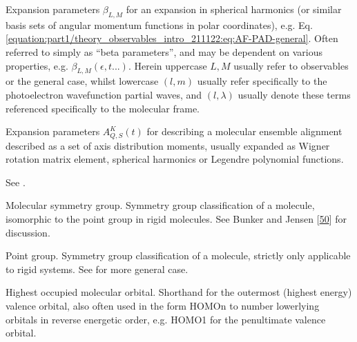 \documentclass[letterpaper,table,10pt,english]{jupyterBook}
\begin{document}
\begin{description}
\sphinxAtStartPar
Expansion parameters \(\beta_{L,M}\) for an expansion in spherical harmonics (or similar basis sets of angular momentum functions in polar coordinates), e.g. Eq. \eqref{equation:part1/theory_observables_intro_211122:eq:AF-PAD-general}. Often referred to simply as “beta parameters”, and may be dependent on various properties, e.g. \(\beta_{L,M}(\epsilon,t...)\). Herein upper\sphinxhyphen{}case \(L,M\) usually refer to observables or the general case, whilst lower\sphinxhyphen{}case \((l,m)\) usually refer specifically to the photoelectron wavefunction partial waves, and \((l,\lambda)\) usually denote these terms referenced specifically to the molecular frame.

\sphinxAtStartPar
Expansion parameters \(A_{Q,S}^{K}(t)\) for describing a molecular ensemble alignment described as a set of axis distribution moments, usually expanded as Wigner rotation matrix element, spherical harmonics or Legendre polynomial functions.

\sphinxAtStartPar
See {\hyperref[\detokenize{backmatter/glossary:term-ADMs}]{}}.

\sphinxAtStartPar
Molecular symmetry group. Symmetry group classification of a molecule, isomorphic to the point group in rigid molecules. See Bunker and Jensen {[}\hyperlink{cite.backmatter/bibliography:id489}{50}{]} for discussion.

\sphinxAtStartPar
Point group. Symmetry group classification of a molecule, strictly only applicable to rigid systems. See {\hyperref[\detokenize{backmatter/glossary:term-MS}]{}} for more general case.

\sphinxAtStartPar
Highest occupied molecular orbital. Short\sphinxhyphen{}hand for the outermost (highest energy) valence orbital, also often used in the form HOMO\sphinxhyphen{}n to number lower\sphinxhyphen{}lying orbitals in reverse energetic order, e.g. HOMO\sphinxhyphen{}1 for the penultimate valence orbital.

\end{description}
\end{document}
